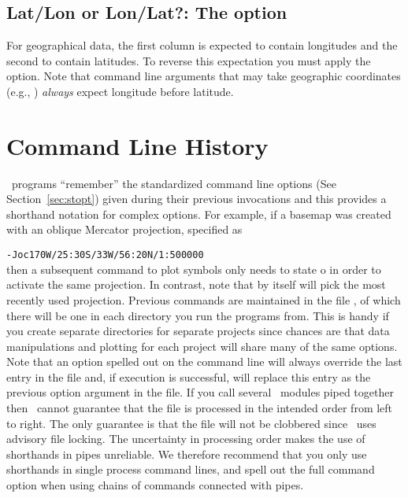 \subsection{Lat/Lon or Lon/Lat?: The \Opt{:} option}
\index{\Opt{:}}

For geographical data, the first column is expected to contain longitudes
and the second to contain latitudes.  To reverse this expectation you must
apply the \Opt{:} option.  Note that command line arguments that may take
geographic coordinates (e.g., ) \emph{always} expect longitude before
latitude.

%

\section{Command Line History}

\GMT\ programs ``remember'' the standardized command line options
(See Section~\ref{sec:stopt}) given during their previous invocations
and this provides a shorthand notation for complex options.
For example, if a basemap was created with an oblique Mercator
projection, specified as

\vspace{\baselineskip} 

\texttt{-Joc170W/25:30S/33W/56:20N/1:500000} \\ 

\vspace{\baselineskip} 
\noindent
then a subsequent  command to plot symbols only needs
to state o in order to activate the same projection.  In
contrast, note that  by itself will pick the most recently used projection.
Previous commands are maintained in the file ,
of which there will be one in each directory you run the programs
from.  This is handy if you create separate directories for
separate projects since chances are that data manipulations
and plotting for each project will share many of the same options.
Note that an option spelled out on the command line will always
override the last entry in the  file and,
if execution is successful, will replace this entry as the
previous option argument in the  file.
If you call several \GMT\ modules piped together then \GMT\ cannot
guarantee that the  file is processed
in the intended order from left to right.  The only guarantee
is that the file will not be clobbered since \GMT\ uses advisory
file locking.  The uncertainty in processing order makes the use
of shorthands in pipes unreliable.  We therefore recommend that you
only use shorthands in single process command lines, and spell out
the full command option when using chains of commands connected with
pipes.

